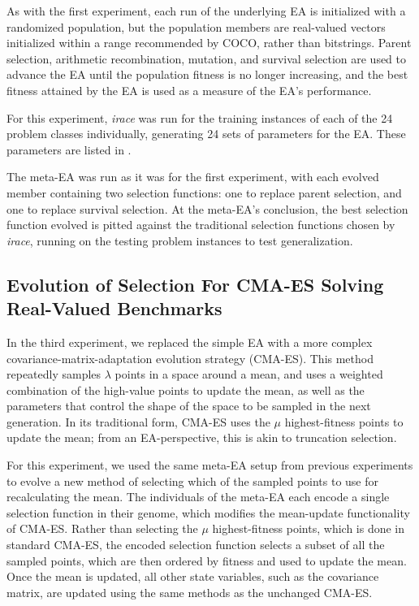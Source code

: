 \documentclass[sigconf]{acmart}
\begin{document}
As with the first experiment, each run of the underlying EA is initialized with a randomized population, but the population members are real-valued vectors initialized within a range recommended by COCO, rather than bitstrings. Parent selection, arithmetic recombination, mutation, and survival selection are used to advance the EA until the population fitness is no longer increasing, and the best fitness attained by the EA is used as a measure of the EA's performance.

For this experiment, \textit{irace} was run for the training instances of each of the 24 problem classes individually, generating 24 sets of parameters for the EA. These parameters are listed in \citep{richter2019thesis}. 

The meta-EA was run as it was for the first experiment, with each evolved member containing two selection functions: one to replace parent selection, and one to replace survival selection. At the meta-EA's conclusion, the best selection function evolved is pitted against the traditional selection functions chosen by \textit{irace}, running on the testing problem instances to test generalization.

\subsection{Evolution of Selection For CMA-ES Solving Real-Valued Benchmarks}
\label{Evolution of Selection For CMA-ES Solving Real-Valued Benchmarks}

In the third experiment, we replaced the simple EA with a more complex covariance-matrix-adaptation evolution strategy (CMA-ES). This method repeatedly samples $\lambda$ points in a space around a mean, and uses a weighted combination of the high-value points to update the mean, as well as the parameters that control the shape of the space to be sampled in the next generation. In its traditional form, CMA-ES uses the $\mu$ highest-fitness points to update the mean; from an EA-perspective, this is akin to truncation selection. 

For this experiment, we used the same meta-EA setup from previous experiments to evolve a new method of selecting which of the sampled points to use for recalculating the mean. The individuals of the meta-EA each encode a single selection function in their genome, which modifies the mean-update functionality of CMA-ES. Rather than selecting the $\mu$ highest-fitness points, which is done in standard CMA-ES, the encoded selection function selects a subset of all the sampled points, which are then ordered by fitness and used to update the mean. Once the mean is updated, all other state variables, such as the covariance matrix, are updated using the same methods as the unchanged CMA-ES.
\end{document}
